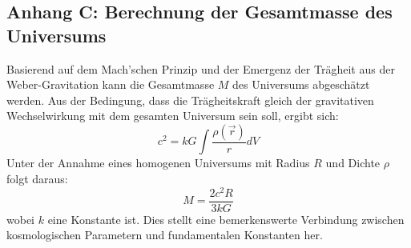 \documentclass[11pt, a4paper]{article}
\begin{document}
\subsection*{Anhang C: Berechnung der Gesamtmasse des Universums}
\label{anh:c}

Basierend auf dem Mach'schen Prinzip und der Emergenz der Trägheit aus der Weber-Gravitation kann die Gesamtmasse $M$ des Universums abgeschätzt werden. Aus der Bedingung, dass die Trägheitskraft gleich der gravitativen Wechselwirkung mit dem gesamten Universum sein soll, ergibt sich:
\[
c^2 = k G \int \frac{\rho(\vec{r})}{r} dV
\]
Unter der Annahme eines homogenen Universums mit Radius $R$ und Dichte $\rho$ folgt daraus:
\[
M = \frac{2 c^2 R}{3 k G}
\]
wobei $k$ eine Konstante ist. Dies stellt eine bemerkenswerte Verbindung zwischen kosmologischen Parametern und fundamentalen Konstanten her.
\end{document}
